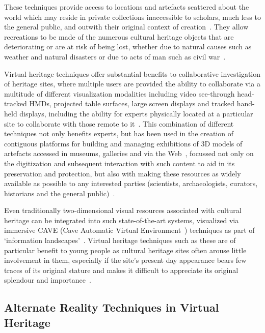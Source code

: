 These techniques provide access to locations and artefacts scattered about the world which may reside in private collections inaccessible to scholars, much less to the general public, and outwith their original context of creation~\cite{griffin:recovering}. They allow recreations to be made of the numerous cultural heritage objects that are deteriorating or are at risk of being lost, whether due to natural causes such as weather and natural disasters or due to acts of man such as civil war~\cite{Ikeuchi2003}.

Virtual heritage techniques offer substantial benefits to collaborative investigation of heritage sites, where multiple users are provided the ability to collaborate via a multitude of different visualization modalities including video see-through head-tracked HMDs, projected table surfaces, large screen displays and tracked hand-held displays, including the ability for experts physically located at a particular site to collaborate with those remote to it~\cite{benko:collaborative}. This combination of different techniques not only benefits experts, but has been used in the creation of contiguous platforms for building and managing exhibitions of 3D models of artefacts accessed in museums, galleries and via the Web~\cite{Wojciechowski2004}, focussed not only on the digitization and subsequent interaction with such content to aid in its preservation and protection, but also with making these resources as widely available as possible to any interested parties (scientists, archaeologists, curators, historians and the general public)~\cite{walczak:applications}.

Even traditionally two-dimensional visual resources associated with cultural heritage can be integrated into such state-of-the-art systems, visualized via immersive CAVE (Cave Automatic Virtual Environment~\cite{Tzortzaki2002}) techniques as part of `information landscapes'~\cite{Ruffaldi2008}. Virtual heritage techniques such as these are of particular benefit to young people as cultural heritage sites often arouse little involvement in them, especially if the site's present day appearance bears few traces of its original stature and makes it difficult to appreciate its original splendour and importance~\cite{ardito:combining}.


\subsection{Alternate Reality Techniques in Virtual Heritage}

